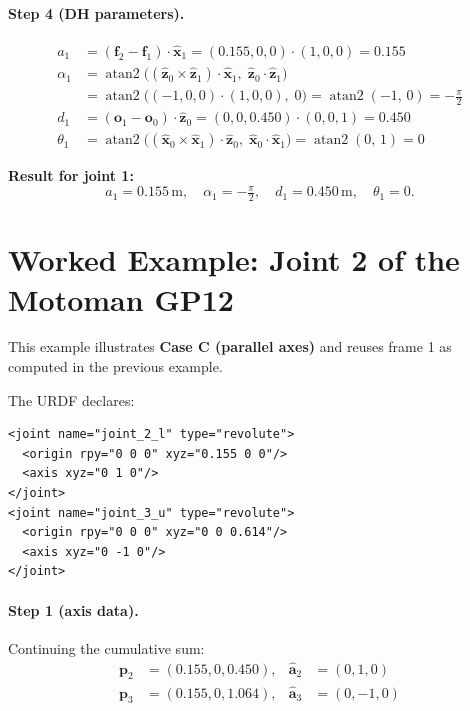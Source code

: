 \documentclass[11pt]{article}
\newcommand{\vect}[1]{\bm{#1}}
\newcommand{\unit}[1]{\hat{\bm{#1}}}
\newcommand{\atantwo}{\operatorname{atan2}}
\begin{document}
\paragraph{Step 4 (DH parameters).}
\begin{align*}
  a_1 &= (\vect{f}_2 - \vect{f}_1) \cdot \unit{x}_1
       = (0.155, 0, 0) \cdot (1, 0, 0) = 0.155 \\[4pt]
  \alpha_1 &= \atantwo\bigl((\unit{z}_0 \times \unit{z}_1) \cdot \unit{x}_1,\;
                              \unit{z}_0 \cdot \unit{z}_1\bigr) \\
           &= \atantwo\bigl((-1, 0, 0) \cdot (1, 0, 0),\; 0\bigr)
            = \atantwo(-1,\, 0) = -\tfrac{\pi}{2} \\[4pt]
  d_1 &= (\vect{o}_1 - \vect{o}_0) \cdot \unit{z}_0
       = (0, 0, 0.450) \cdot (0, 0, 1) = 0.450 \\[4pt]
  \theta_1 &= \atantwo\bigl((\unit{x}_0 \times \unit{x}_1) \cdot \unit{z}_0,\;
                              \unit{x}_0 \cdot \unit{x}_1\bigr)
            = \atantwo(0,\, 1) = 0
\end{align*}

\begin{keybox}
\textbf{Result for joint 1:}
\[
  a_1 = 0.155\,\text{m}, \quad
  \alpha_1 = -\tfrac{\pi}{2}, \quad
  d_1 = 0.450\,\text{m}, \quad
  \theta_1 = 0.
\]
\end{keybox}

\section{Worked Example: Joint 2 of the Motoman GP12}

This example illustrates \textbf{Case C (parallel axes)} and reuses frame 1
as computed in the previous example.

The URDF declares:
\begin{verbatim}
<joint name="joint_2_l" type="revolute">
  <origin rpy="0 0 0" xyz="0.155 0 0"/>
  <axis xyz="0 1 0"/>
</joint>
<joint name="joint_3_u" type="revolute">
  <origin rpy="0 0 0" xyz="0 0 0.614"/>
  <axis xyz="0 -1 0"/>
</joint>
\end{verbatim}

\paragraph{Step 1 (axis data).} Continuing the cumulative sum:
\begin{align*}
  \vect{p}_2 &= (0.155, 0, 0.450), & \unit{a}_2 &= (0, 1, 0) \\
  \vect{p}_3 &= (0.155, 0, 1.064), & \unit{a}_3 &= (0, -1, 0)
\end{align*}
\end{document}
